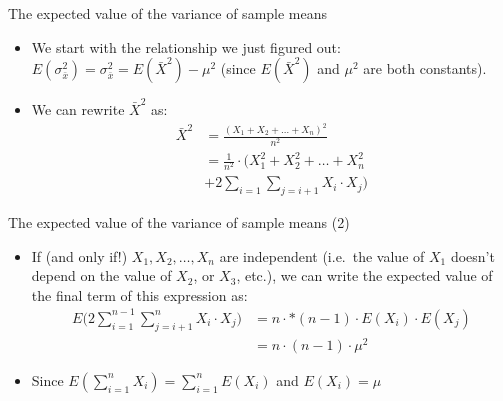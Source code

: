 \begin{frame}{The expected value of the variance of sample means}

\begin{itemize}
\itemsep1pt\parskip0pt
\item
  We start with the relationship we just figured out:
  \(E(\sigma_{\bar{x}}^2) = \sigma_{\bar{x}}^2 = E(\bar{X}^2)-\mu^2\)
  (since \(E(\bar{X}^2)\) and \(\mu^2\) are both constants).
\item
  We can rewrite \(\bar{X}^2\) as: \[
  \begin{aligned} 
  \bar{X}^2 &= \frac{(X_1+X_2+\dots+X_n)^2}{n^2} \\
        &= \frac{1}{n^2}\cdot \Bigg(X_1^2+X_2^2 + \dots+X_n^2 \\
        &+2\sum\limits_{i=1}{\sum\limits_{j=i+1}{X_i\cdot X_j}}\Bigg)
  \end{aligned}
  \]
\end{itemize}

\end{frame}

\begin{frame}{The expected value of the variance of sample means (2)}

\begin{itemize}
\itemsep1pt\parskip0pt
\item
  If (and only if!) \(X_1, X_2,\dots, X_n\) are independent (i.e.~the
  value of \(X_1\) doesn't depend on the value of \(X_2\), or \(X_3\),
  etc.), we can write the expected value of the final term of this
  expression as: \[
  \begin{aligned}
  E\Bigg(2\sum\limits_{i=1}^{n-1}{\sum\limits_{j=i+1}^{n}{X_i\cdot X_j}}\Bigg) &= n\cdot*(n-1)\cdot E(X_i)\cdot E(X_j)\\
  &= n\cdot(n-1)\cdot\mu^2
  \end{aligned}
  \]
\item
  Since \(E(\sum_{i=1}^{n}X_i) = \sum_{i=1}^{n}E(X_i)\) and
  \(E(X_i) = \mu\)
\end{itemize}

\end{frame}

